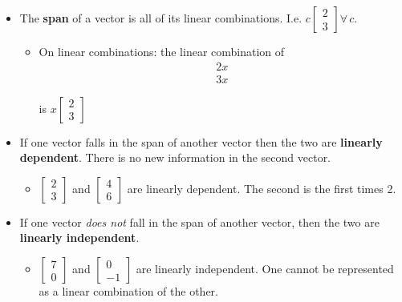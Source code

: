 \begin{itemize}
    \item The \textbf{span} of a vector is all of its linear combinations. I.e. $c\begin{bmatrix} 2 \\ 3 \end{bmatrix} \forall \, c$.
    \begin{itemize}
        \item On linear combinations: the linear combination of 
        \vspace{-1em}
        \begin{align*}
            2x \\
            3x
        \end{align*}

        \vspace{-2em}
        is $x \begin{bmatrix}
            2 \\ 3 
        \end{bmatrix}$
    \end{itemize}
    \item If one vector falls in the span of another vector then the two are \textbf{linearly dependent}. There is no new information in the second vector.
    \begin{itemize}
        \item $ \begin{bmatrix} 2 \\ 3 \end{bmatrix}$ and 
            $\begin{bmatrix} 4 \\ 6 \end{bmatrix}$ are linearly dependent. The second is the first times 2. 
    \end{itemize}
    \item If one vector \emph{does not} fall in the span of another vector, then the two are \textbf{linearly independent}.
    \begin{itemize}
        \item $\begin{bmatrix} 7 \\ 0\end{bmatrix}$ and 
        $\begin{bmatrix} 0 \\ -1 \end{bmatrix}$ are linearly independent. One cannot be represented as a linear combination of the other.
    \end{itemize}

\end{itemize}
